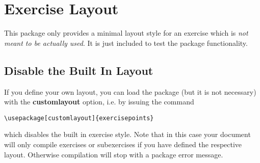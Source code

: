 \documentclass[
  twocolumn,%
  fontsize=9pt,%
  DIV=calc,%
  numbers=noendperiod%
]{scrartcl}
\begin{document}
\section{Exercise Layout}
This package only provides a minimal layout style for an exercise which is \emph{not meant to be actually used}. It is just included to test the package functionality.

\subsection{Disable the Built In Layout}
If you define your own layout, you can load the package (but it is not necessary) with the \textcolor{NavyBlue}{\ttfamily\bfseries customlayout} option, i.e. by issuing the command 
\begin{lstlisting}
\usepackage[customlayout]{exercisepoints}
\end{lstlisting}
which disables the built in exercise style. Note that in this case your document will only compile exercises or subexercises if you have defined the respective layout. Otherwise compilation will stop with a package error message.
\end{document}
